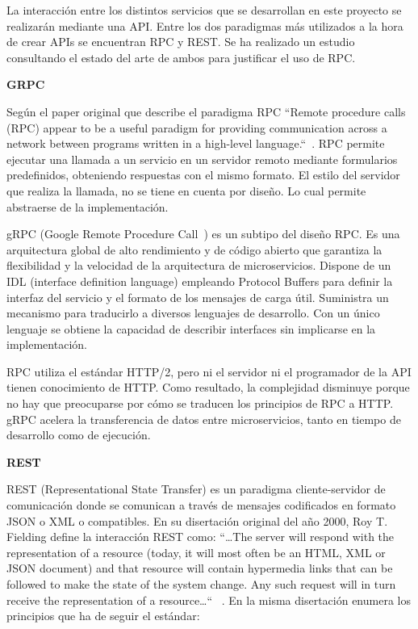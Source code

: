 
La interacción entre los distintos servicios que se desarrollan en este proyecto se realizarán mediante una \gls{API}.
Entre los dos paradigmas más utilizados a la hora de crear APIs se encuentran RPC y REST\@.
Se ha realizado un estudio consultando el estado del arte de ambos para justificar el uso de RPC\@.

\textbf{GRPC}

Según el paper original que describe el paradigma RPC “Remote procedure calls (RPC) appear to be a useful paradigm for providing communication across a
network between programs written in a high-level language.“~\cite{Birrell198439}.
RPC permite ejecutar una llamada a un servicio en un servidor remoto mediante formularios predefinidos, obteniendo respuestas con el mismo formato.
El estilo del servidor que realiza la llamada, no se tiene en cuenta por diseño.
Lo cual permite abstraerse de la implementación.

gRPC (Google Remote Procedure Call~\cite{grpc}) es un subtipo del diseño RPC\@.
Es una arquitectura global de alto rendimiento y de código abierto que garantiza la flexibilidad y la velocidad de la arquitectura de microservicios.
Dispone de un \gls{IDL} (interface definition language) empleando Protocol Buffers para definir la interfaz del servicio y el formato de los mensajes de carga útil.
Suministra un mecanismo para traducirlo a diversos lenguajes de desarrollo.
Con un único lenguaje se obtiene la capacidad de describir interfaces sin implicarse en la implementación.

RPC utiliza el estándar HTTP/2, pero ni el servidor ni el programador de la API tienen conocimiento de HTTP. Como resultado, la complejidad disminuye porque no hay que preocuparse por cómo se traducen los principios de RPC a HTTP. gRPC acelera la transferencia de datos entre microservicios, tanto en tiempo de desarrollo como de ejecución.

\textbf{REST}

\gls{REST} (Representational State Transfer) es un paradigma cliente-servidor de comunicación donde se comunican a través de mensajes codificados en formato JSON o XML o compatibles.
En su disertación original del año 2000, Roy T. Fielding define la interacción REST como: “\ldots The server will respond with the representation of a resource (today, it will most often be an HTML, XML or JSON document) and that resource will contain hypermedia links that can be followed to make the state of the system change.
Any such request will in turn receive the representation of a resource\ldots“ ~\cite{FieldingRoyThomas2000Asat}.
En la misma disertación enumera los principios que ha de seguir el estándar:

